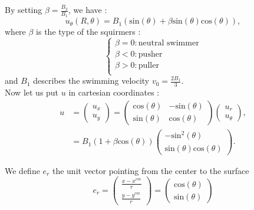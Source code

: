 \documentclass{article}
\begin{document}
By setting $\beta=\frac{B_2}{B_1}$, we have :
$$
u_\theta(R,\theta) = B_1(\mathrm{sin}(\theta) + \beta \mathrm{sin}(\theta)\mathrm{cos}(\theta)),
$$
where $\beta$ is the type of the squirmers :
$$\left\{
    \begin{array}{ll}
        \beta = 0 : \text{neutral swimmer}  \\
        \beta < 0 : \mathrm{pusher} \\
        \beta > 0 : \mathrm{puller} \\
    \end{array}
\right.$$
and $B_1$ describes the swimming velocity $v_0 = \frac{2 B_1}{3}$.
\\ Now let us put $u$ in cartesian coordinates :
\begin{align*}
    u &= \begin{pmatrix}
   u_x \\
   u_y
\end{pmatrix}
= \begin{pmatrix}
   \mathrm{cos}(\theta) & -\mathrm{sin}(\theta) \\
   \mathrm{sin}(\theta) & \mathrm{cos}(\theta)
\end{pmatrix}
\begin{pmatrix}
   u_r \\
   u_\theta
\end{pmatrix}, \\
&= B_1 (1 + \beta \mathrm{cos}(\theta))
\begin{pmatrix}
   -\mathrm{sin}^2(\theta) \\
   \mathrm{sin}(\theta)\mathrm{cos}(\theta)
\end{pmatrix}.
\end{align*}

We define $e_r$ the unit vector pointing from the center to the surface 
$$
e_r = \begin{pmatrix}
   \frac{x - x^{cm}}{r}  \\
   \frac{y - y^{cm}}{r} 
\end{pmatrix} = \begin{pmatrix}
   \mathrm{cos}(\theta) \\
   \mathrm{sin}(\theta)
\end{pmatrix}$$ 
\end{document}
